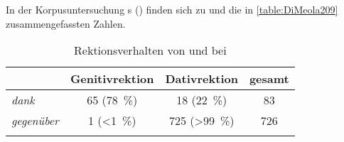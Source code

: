In der Korpusuntersuchung \citeauthor{DiMeola2000}s (\citeyear{DiMeola2000}) finden sich zu  und  die in \autoref{table:DiMeola209} zusammengefassten Zahlen. 
\begin{table}
\centering
\begin{tabular}{llll}
\lsptoprule
      & Genitivrektion                 & Dativrektion                   & gesamt                  \\
      \midrule
\textit{dank}   & \multicolumn{1}{c}{65 (78~\%)} & \multicolumn{1}{c}{18 (22~\%)} & \multicolumn{1}{c}{83} \\
\textit{gegenüber} & \multicolumn{1}{c}{1 (<1~\%)} & \multicolumn{1}{c}{725 (>99~\%)}   & \multicolumn{1}{c}{726} \\
\lspbottomrule
\end{tabular}
\caption{Rektionsverhalten von  und  bei \citet[209]{DiMeola2000}}
\label{table:DiMeola209}
\end{table}

